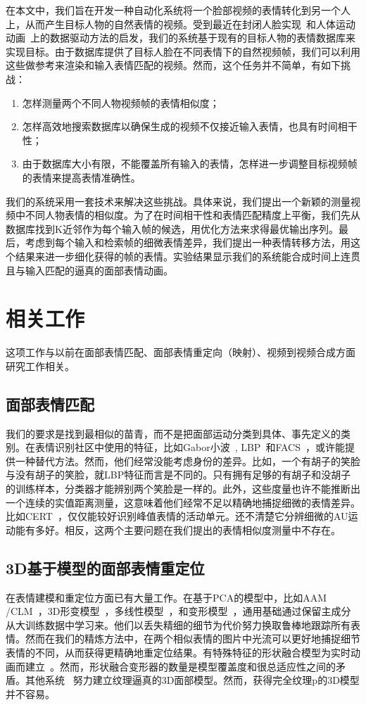 在本文中，我们旨在开发一种自动化系统将一个脸部视频的表情转化到另一个人上，从而产生目标人物的自然表情的视频。受到最近在封闭人脸实现~\cite{deng}和人体运动动画~\cite{xufeng}上的数据驱动方法的启发，我们的系统基于现有的目标人物的表情数据库来实现目标。由于数据库提供了目标人脸在不同表情下的自然视频帧，我们可以利用这些做参考来渲染和输入表情匹配的视频。然而，这个任务并不简单，有如下挑战：
\begin{enumerate}[1.]
  \item 怎样测量两个不同人物视频帧的表情相似度；
  \item 怎样高效地搜索数据库以确保生成的视频不仅接近输入表情，也具有时间相干性；
  \item 由于数据库大小有限，不能覆盖所有输入的表情，怎样进一步调整目标视频帧的表情来提高表情准确性。
\end{enumerate}
我们的系统采用一套技术来解决这些挑战。具体来说，我们提出一个新颖的测量视频中不同人物表情的相似度。为了在时间相干性和表情匹配精度上平衡，我们先从数据库找到K近邻作为每个输入帧的候选，用优化方法来求得最优输出序列。最后，考虑到每个输入和检索帧的细微表情差异，我们提出一种表情转移方法，用这个结果来进一步细化获得的帧的表情。实验结果显示我们的系统能合成时间上连贯且与输入匹配的逼真的面部表情动画。
\section{相关工作}
这项工作与以前在面部表情匹配、面部表情重定向（映射）、视频到视频合成方面研究工作相关。
\subsection{面部表情匹配}
我们的要求是找到最相似的苗青，而不是把面部运动分类到具体、事先定义的类别。在表情识别社区中使用的特征，比如Gabor小波~\cite{Gabor}, LBP~\cite{lbp}和FACS~\cite{facs}，或许能提供一种替代方法。然而，他们经常没能考虑身份的差异。比如，一个有胡子的笑脸与没有胡子的笑脸，就LBP特征而言是不同的。只有拥有足够的有胡子和没胡子的训练样本，分类器才能辨别两个笑脸是一样的。此外，这些度量也许不能推断出一个连续的实值距离测量，这意味着他们经常不足以精确地捕捉细微的表情差异。比如CERT~\cite{CERT}，仅仅能较好识别峰值表情的活动单元。还不清楚它分辨细微的AU运动能有多好。相反，这两个主要问题在我们提出的表情相似度测量中不存在。

\subsection{3D基于模型的面部表情重定位}
在表情建模和重定位方面已有大量工作。在基于PCA的模型中，比如AAM~\cite{AAM}\\ /CLM~\cite{Saragih}，3D形变模型~\cite{morphable}，多线性模型~\cite{multilinear,replacement}，和变形模型~\cite{face_off}，通用基础通过保留主成分从大训练数据中学习来。他们以丢失精细的细节为代价努力换取鲁棒地跟踪所有表情。然而在我们的精炼方法中，在两个相似表情的图片中光流可以更好地捕捉细节表情的不同，从而获得更精确地重定位结果。有特殊特征的形状融合模型为实时动画而建立~\cite{realtime_kinect}。然而，形状融合变形器的数量是模型覆盖度和很总适应性之间的矛盾。其他系统~\cite{photographs,cloning,reanimating} 努力建立纹理逼真的3D面部模型。然而，获得完全纹理p的3D模型并不容易。

